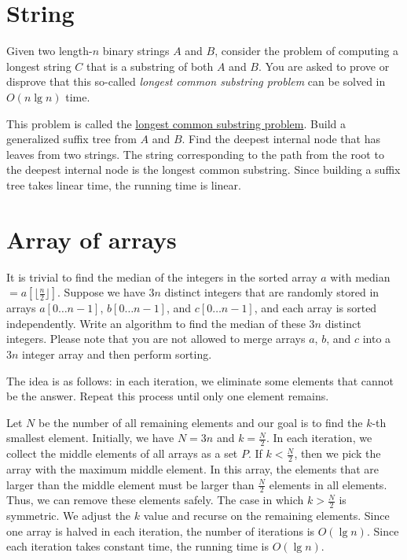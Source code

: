 \section{String}
\begin{Exercise}[title={Longest common substring problem},origin={NTU CSIE 97},difficulty=1]
Given two length-$n$ binary strings $A$ and $B$, consider the problem of computing a longest string $C$ that is a substring of both $A$ and $B$. You are asked to prove or disprove that this so-called \emph{longest common substring problem} can be solved in $O(n \lg n)$ time.
\end{Exercise}
\begin{Answer}
This problem is called the \href{https://en.wikipedia.org/wiki/Longest_common_substring_problem}{longest common substring problem}. Build a generalized suffix tree from $A$ and $B$. Find the deepest internal node that has leaves from two strings. The string corresponding to the path from the root to the deepest internal node is the longest common substring. Since building a suffix tree takes linear time, the running time is linear.
\end{Answer}

\section{Array of arrays}

\begin{Exercise}[origin={NTUST CSIE 98},difficulty=1]
It is trivial to find the median of the integers in the sorted array $a$ with median $= a[\lfloor \frac{n}{2} \rfloor]$. Suppose we have $3n$ distinct integers that are randomly stored in arrays $a[0 \dots n-1]$, $b[0 \dots n-1]$, and $c[0 \dots n-1]$, and each array is sorted independently. Write an algorithm to find the median of these $3n$ distinct integers. Please note that you are not allowed to merge arrays $a$, $b$, and $c$ into a $3n$ integer array and then perform sorting. 
\end{Exercise}
\begin{Answer}
The idea is as follows:  in each iteration, we eliminate some elements that cannot be the answer. Repeat this process until only one element remains.

Let $N$ be the number of all remaining elements and our goal is to find the $k$-th smallest element. Initially, we have $N = 3n$ and $k = \frac{N}{2}$. In each iteration, we collect the middle elements of all arrays as a set $P$. If $k < \frac{N}{2}$, then we pick the array with the maximum middle element. In this array, the elements that are larger than the middle element must be larger than $\frac{N}{2}$ elements in all elements. Thus, we can remove these elements safely. The case in which $k > \frac{N}{2}$ is symmetric. We adjust the $k$ value and recurse on the remaining elements. Since one array is halved in each iteration, the number of iterations is $O(\lg n)$. Since each iteration takes constant time, the running time is $O(\lg n)$.
\end{Answer}

